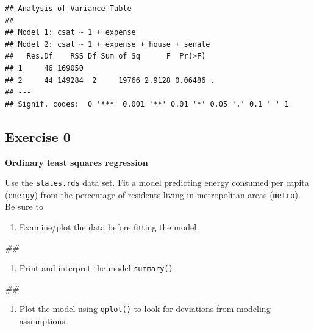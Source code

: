 \documentclass[
]{book}
\newenvironment{Shaded}{\begin{snugshade}}{\end{snugshade}}
\newcommand{\CommentTok}[1]{\textcolor[rgb]{0.56,0.35,0.01}{\textit{#1}}}
\providecommand{\tightlist}{%
  \setlength{\itemsep}{0pt}\setlength{\parskip}{0pt}}
\begin{document}
\begin{verbatim}
## Analysis of Variance Table
## 
## Model 1: csat ~ 1 + expense
## Model 2: csat ~ 1 + expense + house + senate
##   Res.Df    RSS Df Sum of Sq      F  Pr(>F)  
## 1     46 169050                              
## 2     44 149284  2     19766 2.9128 0.06486 .
## ---
## Signif. codes:  0 '***' 0.001 '**' 0.01 '*' 0.05 '.' 0.1 ' ' 1
\end{verbatim}

\hypertarget{exercise-0-1}{%
\subsection{Exercise 0}\label{exercise-0-1}}

\textbf{Ordinary least squares regression}

Use the \texttt{states.rds} data set. Fit a model predicting energy consumed per capita (\texttt{energy}) from the percentage of residents living in metropolitan areas (\texttt{metro}). Be sure to

\begin{enumerate}
\def\labelenumi{\arabic{enumi}.}
\tightlist
\item
  Examine/plot the data before fitting the model.
\end{enumerate}

\begin{Shaded}
\begin{Highlighting}[]
\CommentTok{\#\# }
\end{Highlighting}
\end{Shaded}

\begin{enumerate}
\def\labelenumi{\arabic{enumi}.}
\setcounter{enumi}{1}
\tightlist
\item
  Print and interpret the model \texttt{summary()}.
\end{enumerate}

\begin{Shaded}
\begin{Highlighting}[]
\CommentTok{\#\# }
\end{Highlighting}
\end{Shaded}

\begin{enumerate}
\def\labelenumi{\arabic{enumi}.}
\setcounter{enumi}{2}
\tightlist
\item
  Plot the model using \texttt{qplot()} to look for deviations from modeling assumptions.
\end{enumerate}
\end{document}
